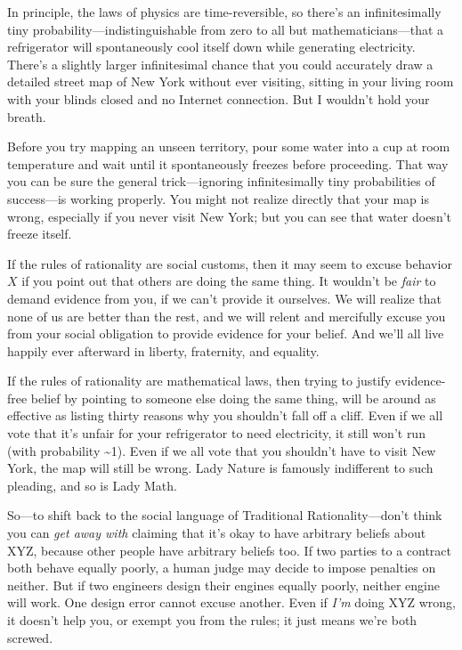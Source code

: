 {
 In principle, the laws of physics are time-reversible, so
there's an infinitesimally tiny
probability---indistinguishable from zero to all but
mathematicians---that a refrigerator will spontaneously cool itself
down while generating electricity. There's a slightly
larger infinitesimal chance that you could accurately draw a detailed
street map of New York without ever visiting, sitting in your living
room with your blinds closed and no Internet connection. But I
wouldn't hold your breath.}

{
 Before you try mapping an unseen territory, pour some water into a
cup at room temperature and wait until it spontaneously freezes before
proceeding. That way you can be sure the general trick---ignoring
infinitesimally tiny probabilities of success---is working properly.
You might not realize directly that your map is wrong, especially if
you never visit New York; but you can see that water
doesn't freeze itself.}

{
 If the rules of rationality are social customs, then it may seem
to excuse behavior $X$ if you point out that others are doing the same
thing. It wouldn't be \textit{fair} to demand evidence
from you, if we can't provide it ourselves. We will
realize that none of us are better than the rest, and we will relent
and mercifully excuse you from your social obligation to provide
evidence for your belief. And we'll all live happily
ever afterward in liberty, fraternity, and equality.}

{
 If the rules of rationality are mathematical laws, then trying to
justify evidence-free belief by pointing to someone else doing the same
thing, will be around as effective as listing thirty reasons why you
shouldn't fall off a cliff. Even if we all vote that
it's unfair for your refrigerator to need electricity,
it still won't run (with probability \~{}1). Even if we
all vote that you shouldn't have to visit New York, the
map will still be wrong. Lady Nature is famously indifferent to such
pleading, and so is Lady Math.}

{
 So---to shift back to the social language of Traditional
Rationality---don't think you can \textit{get away
with} claiming that it's okay to have arbitrary beliefs
about XYZ, because other people have arbitrary beliefs too. If two
parties to a contract both behave equally poorly, a human judge may
decide to impose penalties on neither. But if two engineers design
their engines equally poorly, neither engine will work. One design
error cannot excuse another. Even if \textit{I'm} doing
XYZ wrong, it doesn't help you, or exempt you from the
rules; it just means we're both screwed.}


